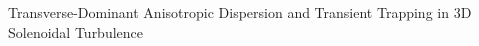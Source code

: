 \documentclass[]{article}
\begin{document}
Transverse-Dominant Anisotropic Dispersion and Transient Trapping in 3D Solenoidal Turbulence
\end{document}
